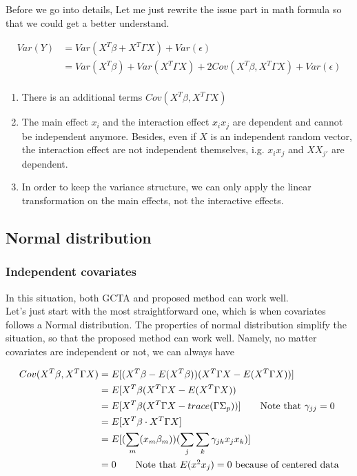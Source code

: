 \documentclass[]{article}
\providecommand{\tightlist}{%
  \setlength{\itemsep}{0pt}\setlength{\parskip}{0pt}}
\begin{document}
Before we go into details, Let me just rewrite the issue part in math
formula so that we could get a better understand.

\begin{align*}
Var(Y) &= Var(X^T\beta + X^T\Gamma X) + Var(\epsilon) \\
         &= Var(X^T\beta) + Var(X^T\Gamma X) + 2Cov(X^T\beta, X^T\Gamma X) + Var(\epsilon) \\
\end{align*}

\begin{enumerate}
\def\labelenumi{\arabic{enumi}.}
\tightlist
\item
  There is an additional terms \(Cov(X^T\beta, X^T\Gamma X)\)
\item
  The main effect \(x_i\) and the interaction effect \(x_ix_j\) are
  dependent and cannot be independent anymore. Besides, even if \(X\) is
  an independent random vector, the interaction effect are not
  independent themselves, i.g. \(x_i x_j\) and \(X X_{j'}\) are
  dependent.
\item
  In order to keep the variance structure, we can only apply the linear
  transformation on the main effects, not the interactive effects.
\end{enumerate}

\subsection{Normal distribution}\label{normal-distribution}

\subsubsection{Independent covariates}\label{independent-covariates}

In this situation, both GCTA and proposed method can work well.\\
Let's just start with the most straightforward one, which is when
covariates follows a Normal distribution. The properties of normal
distribution simplify the situation, so that the proposed method can
work well. Namely, no matter covariates are independent or not, we can
always have

\begin{align*}
Cov(X^T\beta, X^T\Gamma X) &= E[(X^T\beta - E(X^T\beta))(X^T\Gamma X - E(X^T\Gamma X))]\\
    &= E[X^T\beta(X^T\Gamma X - E(X^T\Gamma X)) \\
    &= E[X^T\beta(X^T\Gamma X - trace(\Gamma\Sigma_p))] \tag*{Note that $\gamma_{jj} = 0$}\\
    &= E[X^T\beta \cdot X^T\Gamma X] \\
    &= E[(\sum_m(x_{m}\beta_m))(\sum_j\sum_k\gamma_{jk}x_{j} x_{k}) ] \\
    & = 0 \tag*{Note that $E(x^2x_j) = 0$ because of centered data}
\end{align*}
\end{document}
